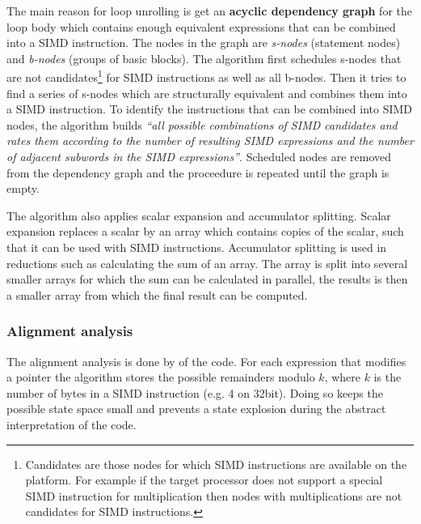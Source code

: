 \documentclass[a4paper,10pt]{article}
\begin{document}
The main reason for loop unrolling is get an \textbf{acyclic dependency graph} for the loop body which contains enough equivalent
expressions that can be combined into a SIMD instruction. The nodes in the graph are \textit{s-nodes} (statement nodes) and
\textit{b-nodes} (groups of basic blocks). The algorithm first schedules s-nodes that are not candidates\footnote{Candidates are
those nodes for which SIMD instructions are available on the platform. For example if the target processor does not support a special
SIMD instruction for multiplication then nodes with multiplications are not candidates for SIMD instructions.} for SIMD instructions
as well as all b-nodes. Then it tries to find a series of s-nodes which are structurally equivalent and combines them into a SIMD
instruction. To identify the instructions that can be combined into SIMD nodes, the algorithm builds \textit{``all possible
combinations of SIMD candidates and rates them according to the number of resulting SIMD expressions and the number 
of adjacent subwords in the SIMD expressions''}. Scheduled nodes are removed from the dependency graph and the proceedure is repeated 
until the graph is empty.

The algorithm also applies scalar expansion and accumulator splitting. Scalar expansion replaces a scalar by an array which 
contains copies of the scalar, such that it can be used with SIMD instructions. Accumulator splitting is used in reductions such as 
calculating the sum of an array. The array is split into several smaller arrays for which the sum can be calculated in parallel, the 
results is then a smaller array from which the final result can be computed.

\subsubsection{Alignment analysis}
The alignment analysis is done by  of the code. For each expression that modifies a pointer the
algorithm stores the possible remainders modulo $k$, where $k$ is the number of bytes in a SIMD instruction (e.g. 4 on 32bit). Doing
so keeps the possible state space small and prevents a state explosion during the abstract interpretation of the code.
\end{document}
